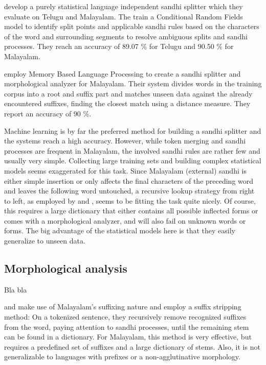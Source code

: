 \documentclass[a4paper]{article}
\begin{document}
\textcite{prathyusha2015sandhi} develop a purely statistical language independent sandhi splitter which they evaluate on Telugu and Malayalam. The train a Conditional Random Fields model to identify split points and applicable sandhi rules based on the characters of the word and surrounding segments to resolve ambiguous splits and sandhi processes. They reach an accuracy of 89.07 \% for Telugu and 90.50 \% for Malayalam.

\textcite{nisha2016sandhi} employ Memory Based Language Processing to create a sandhi splitter and morphological analyzer for Malayalam. Their system divides words in the training corpus into a root and suffix part and matches unseen data against the already encountered suffixes, finding the closest match using a distance measure. They report an accuracy of 90 \%.

Machine learning is by far the preferred method for building a sandhi splitter and the systems reach a high accuracy. However, while token merging and sandhi processes are frequent in Malayalam, the involved sandhi rules are rather few and usually very simple. Collecting large training sets and building complex statistical models seems exaggerated for this task. Since Malayalam (external) sandhi is either simple insertion or only affects the final characters of the preceding word and leaves the following word untouched, a recursive lookup strategy from right to left, as employed by \textcite{manju2009pos} and \textcite{bindu2011pos}, seems to be fitting the task quite nicely. Of course, this requires a large dictionary that either contains all possible inflected forms or comes with a morphological analyzer, and will also fail on unknown words or forms. The big advantage of the statistical models here is that they easily generalize to unseen data.

\subsection{Morphological analysis}

Bla bla

\textcite{rajeev2007morph} and \textcite{jayan2011translation} make use of Malayalam's suffixing nature and employ a suffix stripping method: On a tokenized sentence, they recursively remove recognized suffixes from the word, paying attention to sandhi processes, until the remaining stem can be found in a dictionary. For Malayalam, this method is very effective, but requires a predefined set of suffixes and a large dictionary of stems. Also, it is not generalizable to languages with prefixes or a non-agglutinative morphology.
\end{document}
